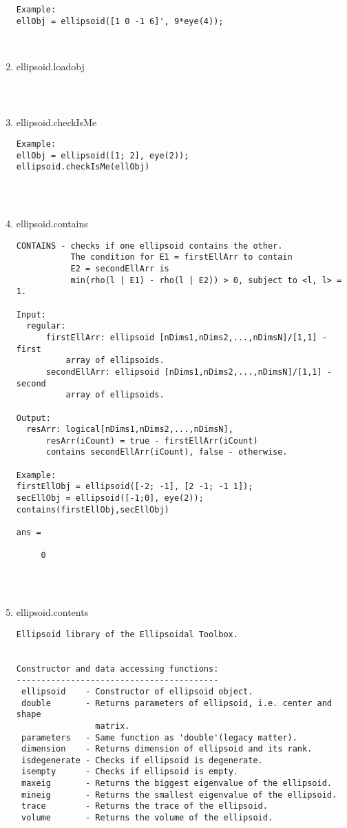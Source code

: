 \begin{enumerate}
\begin{lstlisting}
Example:
ellObj = ellipsoid([1 0 -1 6]', 9*eye(4));



\end{lstlisting}
\fontfamily{\familydefault}
\selectfont
\item {ellipsoid.loadobj}
\selectfont
\begin{lstlisting}



\end{lstlisting}
\fontfamily{\familydefault}
\selectfont
\item {ellipsoid.checkIsMe}
\selectfont
\begin{lstlisting}
Example:
ellObj = ellipsoid([1; 2], eye(2));
ellipsoid.checkIsMe(ellObj)




\end{lstlisting}
\fontfamily{\familydefault}
\selectfont
\item {ellipsoid.contains}
\selectfont
\begin{lstlisting}
CONTAINS - checks if one ellipsoid contains the other.
           The condition for E1 = firstEllArr to contain
           E2 = secondEllArr is
           min(rho(l | E1) - rho(l | E2)) > 0, subject to <l, l> = 1.

Input:
  regular:
      firstEllArr: ellipsoid [nDims1,nDims2,...,nDimsN]/[1,1] - first
          array of ellipsoids.
      secondEllArr: ellipsoid [nDims1,nDims2,...,nDimsN]/[1,1] - second
          array of ellipsoids.

Output:
  resArr: logical[nDims1,nDims2,...,nDimsN],
      resArr(iCount) = true - firstEllArr(iCount)
      contains secondEllArr(iCount), false - otherwise.

Example:
firstEllObj = ellipsoid([-2; -1], [2 -1; -1 1]);
secEllObj = ellipsoid([-1;0], eye(2));
contains(firstEllObj,secEllObj)

ans =

     0




\end{lstlisting}
\fontfamily{\familydefault}
\selectfont
\item {ellipsoid.contents}
\selectfont
\begin{lstlisting}
Ellipsoid library of the Ellipsoidal Toolbox.


Constructor and data accessing functions:
-----------------------------------------
 ellipsoid    - Constructor of ellipsoid object.
 double       - Returns parameters of ellipsoid, i.e. center and shape
                matrix.
 parameters   - Same function as 'double'(legacy matter).
 dimension    - Returns dimension of ellipsoid and its rank.
 isdegenerate - Checks if ellipsoid is degenerate.
 isempty      - Checks if ellipsoid is empty.
 maxeig       - Returns the biggest eigenvalue of the ellipsoid.
 mineig       - Returns the smallest eigenvalue of the ellipsoid.
 trace        - Returns the trace of the ellipsoid.
 volume       - Returns the volume of the ellipsoid.



\end{lstlisting}
\end{enumerate}
